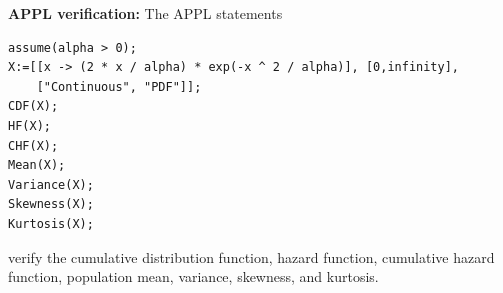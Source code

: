 \documentclass[12pt,fullpage]{article}
\begin{document}
\vspace{0.1in}

\noindent
{\bf APPL verification:}
The APPL statements
\begin{verbatim}
assume(alpha > 0);
X:=[[x -> (2 * x / alpha) * exp(-x ^ 2 / alpha)], [0,infinity],
    ["Continuous", "PDF"]];
CDF(X);
HF(X);
CHF(X);
Mean(X);
Variance(X);
Skewness(X);
Kurtosis(X);
\end{verbatim}
verify the cumulative distribution function, hazard function, cumulative hazard function, population mean, variance, skewness, and kurtosis.
\end{document}
